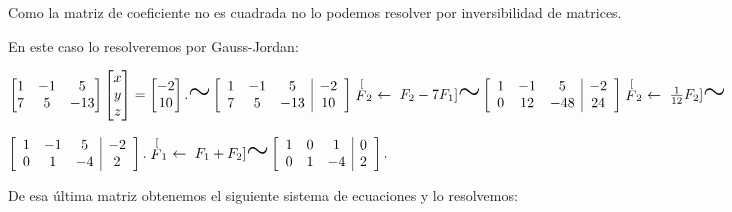 \documentclass[11pt]{article}
\newcommand{\semejante}[1]{\stackrel[#1]{}{\text{\huge$\sim$}}}%
\begin{document}
\begin{enumerate}[\hspace{-5mm} 1) ]
\begin{enumerate}[i) ]
Como la matriz de coeficiente no es cuadrada no lo podemos resolver por inversibilidad de matrices. 


\bigskip

En este caso lo resolveremos por Gauss-Jordan: 


$
\begin{bmatrix}
1 & -1 & 5 \\
7 & 5 & -13
\end{bmatrix}
\begin{bmatrix}
x \\ y \\ z
\end{bmatrix}
=
\begin{bmatrix}
-2 \\ 10
\end{bmatrix}.
\text{\huge $\sim$}
\left[
\begin{array}{ccc|c}
1 & -1 & 5 & -2 \\
7 & 5 & -13 & 10
\end{array}
\right]
\semejante{F_2 \ \leftarrow\  F_2 - 7F_1 }
\left[
\begin{array}{ccc|c}
1 & -1 & 5 & -2 \\
0 & 12 & -48 & 24
\end{array}
\right] 
\semejante{F_2 \ \leftarrow \ \tfrac{1}{12} F_2} $

\medskip

$
\left[
\begin{array}{ccc|c}
1 & -1 & 5 & -2 \\
0 & 1 & -4 & 2
\end{array}
\right].
\semejante{F_1 \ \leftarrow \ F_1 + F_2  }
\left[
\begin{array}{ccc|c}
1 & 0 & 1 & 0 \\
0 & 1 & -4 & 2
\end{array}
\right].
$
\bigskip 

De esa última matriz obtenemos el siguiente sistema de ecuaciones y lo resolvemos:

\medskip 


\end{enumerate}
\end{enumerate}
\end{document}
